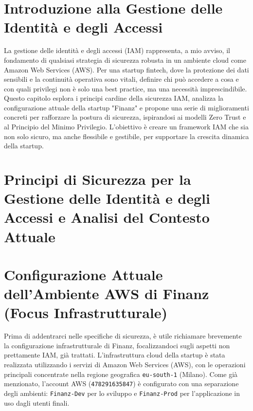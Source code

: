 \section{Introduzione alla Gestione delle Identità e degli Accessi}
La gestione delle identità e degli accessi (IAM) rappresenta, a mio avviso, il fondamento di qualsiasi strategia di sicurezza robusta in un ambiente cloud come Amazon Web Services (AWS). Per una startup fintech, dove la protezione dei dati sensibili e la continuità operativa sono vitali, definire chi può accedere a cosa e con quali privilegi non è solo una best practice, ma una necessità imprescindibile. Questo capitolo esplora i principi cardine della sicurezza IAM, analizza la configurazione attuale della startup "Finanz" e propone una serie di miglioramenti concreti per rafforzare la postura di sicurezza, ispirandosi ai modelli Zero Trust e al Principio del Minimo Privilegio. L'obiettivo è creare un framework IAM che sia non solo sicuro, ma anche flessibile e gestibile, per supportare la crescita dinamica della startup.

\section{Principi di Sicurezza per la Gestione delle Identità e degli Accessi e Analisi del Contesto Attuale}
\label{sec:principi-identita-accessi}
\section{Configurazione Attuale dell'Ambiente AWS di Finanz (Focus Infrastrutturale)}
\label{sec:aws_infrastruttura_attuale_cap2}
Prima di addentrarci nelle specifiche di sicurezza, è utile richiamare brevemente la configurazione infrastrutturale di Finanz, focalizzandoci sugli aspetti non prettamente IAM, già trattati.
L'infrastruttura cloud della startup è stata realizzata utilizzando i servizi di Amazon Web Services (AWS), con le operazioni principali concentrate nella regione geografica \texttt{eu-south-1} (Milano). Come già menzionato, l'account AWS (\texttt{478291635847}) è configurato con una separazione degli ambienti: \texttt{Finanz-Dev} per lo sviluppo e \texttt{Finanz-Prod} per l'applicazione in uso dagli utenti finali.

